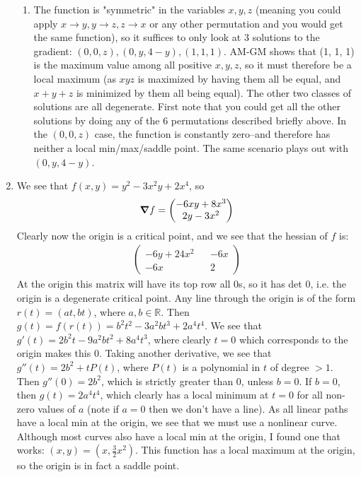 \documentclass[12pt]{article}
\theoremstyle{definition}
\theoremstyle{remark}
\newcommand{\R}{\mathbb{R}}
\begin{document}
\begin{enumerate}[leftmargin=\labelsep]
\begin{enumerate}
		\item 
		The function is "symmetric" in the variables $x, y, z$ (meaning you could apply $x \to y, y \to z, z \to x$ or any other permutation and you would get the same function), so it suffices to only look at 3 solutions to the gradient: $(0, 0, z), (0, y, 4-y), (1, 1, 1)$. AM-GM shows that (1, 1, 1) is the maximum value among all positive $x, y, z$, so it must therefore be a local maximum (as $xyz$ is maximized by having them all be equal, and $x+y+z$ is minimized by them all being equal). The other two classes of solutions are all degenerate. First note that you could get all the other solutions by doing any of the 6 permutations described briefly above. In the $(0, 0, z)$ case, the function is constantly zero--and therefore has neither a local min/max/saddle point. The same scenario plays out with $(0, y, 4-y)$.
	\end{enumerate}
	\item 
	We see that $f(x, y) = y^2-3x^2y+2x^4$, so
	\begin{align*}
		\grad{f} = 
		\begin{pmatrix}
			-6xy+8x^3 \\
			2y-3x^2
		\end{pmatrix}
	\end{align*}
	Clearly now the origin is a critical point, and we see that the hessian of $f$ is:
	\begin{align*}
		\begin{pmatrix}
			-6y+24x^2 && -6x \\
			-6x && 2
		\end{pmatrix}
	\end{align*}
	At the origin this matrix will have its top row all 0s, so it has det 0, i.e. the origin is a degenerate critical point. Any line through the origin is of the form $r(t) = (at, bt)$, where $a, b \in \R$. Then $g(t) = f(r(t)) = b^2t^2 - 3a^2bt^3 + 2a^4t^4$. We see that $g'(t) = 2b^2t - 9a^2bt^2+8a^4t^3$, where clearly $t = 0$ which corresponds to the origin makes this $0$. Taking another derivative, we see that $g''(t) = 2b^2+tP(t)$, where $P(t)$ is a polynomial in $t$ of degree $>1$. Then $g''(0) = 2b^2$, which is strictly greater than 0, unless $b=0$. If $b=0$, then $g(t) = 2a^4t^4$, which clearly has a local minimum at $t=0$ for all non-zero values of $a$ (note if $a=0$ then we don't have a line). As all linear paths have a local min at the origin, we see that we must use a nonlinear curve. Although most curves also have a local min at the origin, I found one that works: $(x,y)=(x,\frac32x^2)$. This function has a local maximum at the origin, so the origin is in fact a saddle point.
	\end{enumerate}
\end{document}
